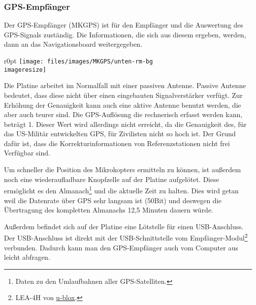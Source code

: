 \subsubsection{\acs{GPS}-Empfänger}

Der \ac{GPS}-Empfänger (MKGPS) ist für den Empfänger und die Auswertung des \ac{GPS}-Signals zuständig.
Die Informationen, die sich aus diesem ergeben, werden, dann an das Navigationsboard weitergegeben.
\newpage

\begin{wrapfigure}{r}{0pt}
	\texttt{[image: files/images/MKGPS/unten-rm-bg\\imageresize]}
\end{wrapfigure}
Die Platine arbeitet im Normalfall mit einer passiven Antenne.
Passive Antenne bedeutet, dass diese nicht über einen eingebauten Signalverstärker verfügt.
Zur Erhöhung der Genauigkeit kann auch eine aktive Antenne benutzt werden,
die aber auch teurer sind.
Die \ac{GPS}-Auflösung die rechnerisch erfasst werden kann,
beträgt \unit{1}{\centi\metre}.
Dieser Wert wird allerdings nicht erreicht,
da die Genauigkeit des, für das US-Militär entwickelten \ac{GPS},
für Zivilisten nicht so hoch ist.
Der Grund dafür ist, dass die Korrekturinformationen von Referenzstationen nicht frei Verfügbar
sind.

Um schneller die Position des Mikrokopters ermitteln zu können,
ist außerdem noch eine wiederaufladbare Knopfzelle auf der Platine aufgelötet.
Diese ermöglicht es den Almanach\footnote{Daten zu den Umlaufbahnen aller \ac{GPS}-Satelliten.}
und die aktuelle Zeit zu halten.
Dies wird getan weil die Datenrate über \ac{GPS} sehr langsam ist (\unit{50}{Bit\per\second})
und deswegen die Übertragung des kompletten Almanachs 12,5 Minuten dauern würde.

Außerdem befindet sich auf der Platine eine Lötstelle für einen \ac{USB}-Anschluss. Der
\ac{USB}-Anschluss ist direkt mit der \ac{USB}-Schnittstelle vom Empfänger-Modul\footnote{LEA-4H
von \href{http://www.u-blox.com/}{u-blox}.} verbunden.
Dadurch kann man den \ac{GPS}-Empfänger auch vom Computer aus leicht abfragen.
